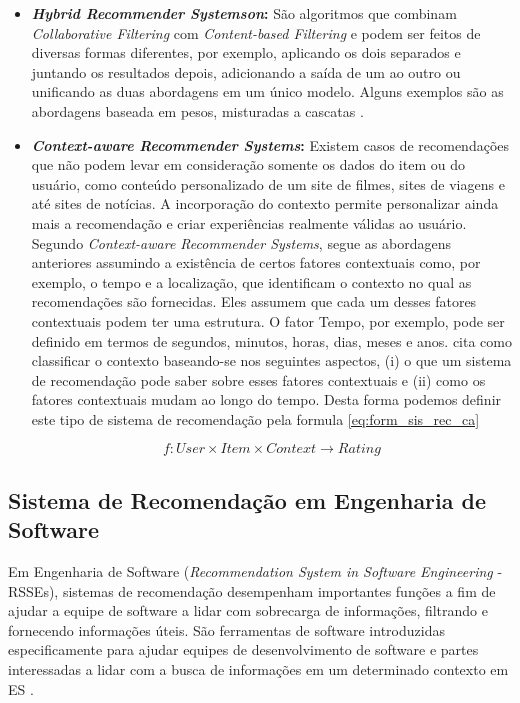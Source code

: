 \begin{itemize}
	\item \textbf{\textit{Hybrid Recommender Systemson}:}
	São algoritmos que combinam \textit{Collaborative Filtering} com \textit{Content-based Filtering} e podem ser feitos de diversas formas diferentes, por exemplo, aplicando os dois separados e juntando os resultados depois, adicionando a saída de um ao outro ou unificando as duas abordagens em um único modelo. Alguns exemplos são as abordagens baseada em pesos, misturadas a cascatas \cite{jannach2010recommender}.
	
	
	\item \textbf{\textit{Context-aware Recommender Systems}:} 
	Existem casos de recomendações que não podem levar em consideração somente os dados do item ou do usuário, como conteúdo personalizado de um site de filmes, sites de viagens e até sites de notícias. A incorporação do contexto permite personalizar ainda mais a recomendação e criar experiências realmente válidas ao usuário. Segundo \citet{rahman2013ide} \textit{Context-aware Recommender Systems}, segue as abordagens anteriores assumindo a existência de certos fatores contextuais como, por exemplo, o tempo e a localização, que identificam o contexto no qual as recomendações são fornecidas. Eles assumem que cada um desses fatores contextuais podem ter uma estrutura. O fator Tempo, por exemplo, pode ser definido em termos de segundos, minutos, horas, dias, meses e anos. \citet{rahman2013ide} cita como classificar o contexto baseando-se nos seguintes aspectos, (i) o que um sistema de recomendação pode saber sobre esses fatores contextuais e (ii) como os fatores contextuais mudam ao longo do tempo. Desta forma podemos definir este tipo de sistema de recomendação pela formula \ref{eq:form_sis_rec_ca}
	
	\begin{equation}
		\label{eq:form_sis_rec_ca}
		f:User \times Item \times Context \rightarrow Rating
	\end{equation}

\end{itemize}


\subsection{Sistema de Recomendação em Engenharia de Software}

Em Engenharia de Software (\textit{Recommendation System in Software Engineering} - RSSEs), sistemas de recomendação desempenham importantes funções a fim de ajudar a equipe de software a lidar com sobrecarga de informações, filtrando e fornecendo informações úteis. São ferramentas de software introduzidas especificamente para ajudar equipes de desenvolvimento de software e partes interessadas a lidar com a busca de informações em um determinado contexto em ES \cite{robillard2010recommendation}.

